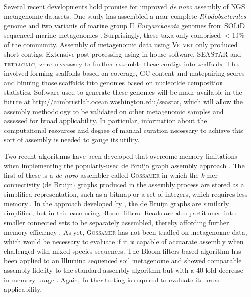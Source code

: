 Several recent developments hold promise for improved \emph{de} \emph{novo} assembly of \ac{NGS} metagenomic datasets.
One study has assembled a near-complete \emph{Rhodobacterales} genome and two variants of marine group II \emph{Euryarchaeota} genomes from SOLiD sequenced marine metagenomes \cite{Iverson2012}.
Surprisingly, these taxa only comprised $<$10\% of the community.
Assembly of metagenomic data using \textsc{Velvet} only produced short contigs.
Extensive post-processing using in-house software, \textsc{SEAStAR} and \textsc{tetracalc}, were necessary to further assemble these contigs into scaffolds.
This involved forming scaffolds based on coverage, GC content and matepairing scores and binning those scaffolds into genomes based on nucleotide composition statistics.
Software used to generate these genomes will be made available in the future at 
\url{http://armbrustlab.ocean.washington.edu/seastar},
which will allow the assembly methodology to be validated on other metagenomic samples and assessed for broad applicability.
In particular, information about the computational resources and degree of manual curation necessary to achieve this sort of assembly is needed to gauge its utility.

Two recent algorithms have been developed that overcome memory limitations when implementing the popularly-used de Bruijn graph assembly approach \cite{Conway2012, Pell2012}.
The first of these is a \emph{de novo} assembler called \textsc{Gossamer} in which the \emph{k}-mer connectivity (de Bruijn) graphs produced in the assembly process are stored as a simplified representation, such as a bitmap or a set of integers, which requires less memory \cite{Conway2012}.
In the approach developed by \citet{Pell2012}, the de Bruijn graphs are similarly simplified, but in this case using Bloom filters.
Reads are also partitioned into smaller connected sets to be separately assembled, thereby affording further memory efficiency \cite{Pell2012}.
As yet, \textsc{Gossamer} has not been trialled on metagenomic data, which would be necessary to evaluate if it is capable of accuarate assembly when challenged with mixed species sequences.
The Bloom filters-based algorithm has been applied to an Illumina sequenced soil metagenome and showed comparable assembly fidelity to the standard assembly algorithm but with a 40-fold decrease in memory usage \cite{Pell2012}.
Again, further testing is required to evaluate its broad applicability.

